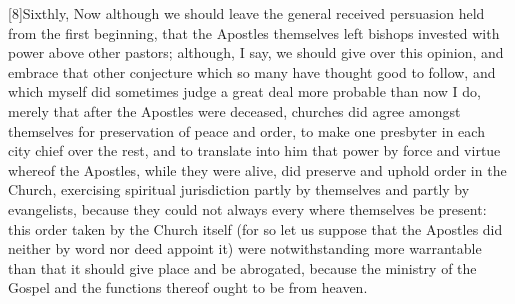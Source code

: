 [8]Sixthly, Now although we should leave the general received persuasion held from the first beginning, that the Apostles themselves left bishops invested with power above other pastors; although, I say, we should give over this opinion, and embrace that other conjecture which so many have thought good to follow, and which myself did  sometimes judge a great deal more probable than now I do,
 merely that after the Apostles were deceased, churches did  agree amongst themselves for preservation of peace and order, to make one presbyter in each city chief over the rest, and to translate into him that power by force and virtue whereof the Apostles, while they were alive,
 did preserve and uphold order in the Church, exercising spiritual jurisdiction partly by themselves and partly by evangelists, because they could not always every where themselves be present: this order taken by the Church itself (for so let us suppose that the Apostles did neither by word nor deed appoint it) were notwithstanding more warrantable than that it should give place and be abrogated, because the ministry of the Gospel and the functions thereof ought to be from heaven.

